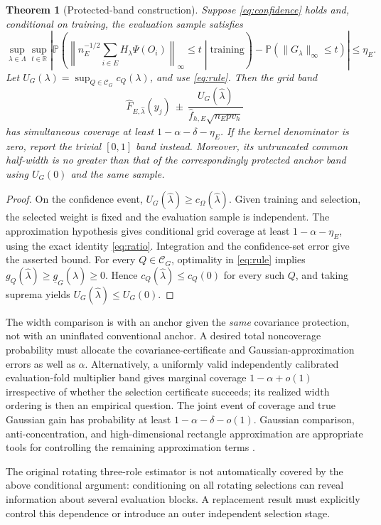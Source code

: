 \documentclass[11pt]{article}
\newtheorem{theorem}{Theorem}
\theoremstyle{remark}\newtheorem{remark}[theorem]{Remark}
\newcommand{\Pp}{\mathbb P}
\newcommand{\R}{\mathbb R}
\newcommand{\calC}{\mathcal C}
\begin{document}
\begin{theorem}[Protected-band construction]\label{thm:coverage}
Suppose \eqref{eq:confidence} holds and, conditional on training, the evaluation sample satisfies
\[
 \sup_{\lambda\in\Lambda}\sup_{t\in\R}
 \left|\Pp\left(\left\|n_E^{-1/2}\sum_{i\in E}H_\lambda\Psi(O_i)\right\|_\infty\leq t
 \middle|\text{training}\right)-\Pp(\|G_\lambda\|_\infty\leq t)\right|\leq\eta_E.
\]
Let $U_G(\lambda)=\sup_{Q\in\calC_G}c_Q(\lambda)$, and use \eqref{eq:rule}. Then the grid band
\[
 \widehat F_{E,\widehat\lambda}(y_j)\ \pm\
 \frac{U_G(\widehat\lambda)}{\widehat f_{h,E}\sqrt{n_Epv_h}}
\]
has simultaneous coverage at least $1-\alpha-\delta-\eta_E$. If the kernel denominator is zero, report the trivial $[0,1]$ band instead.
Moreover, its untruncated common half-width is no greater than that of the correspondingly protected anchor band using $U_G(0)$ and the same sample.
\end{theorem}
\begin{proof}
On the confidence event, $U_G(\widehat\lambda)\geq c_\Omega(\widehat\lambda)$.
Given training and selection, the selected weight is fixed and the evaluation sample is independent. The approximation hypothesis gives conditional grid coverage at least $1-\alpha-\eta_E$, using the exact identity \eqref{eq:ratio}. Integration and the confidence-set error give the asserted bound.
For every $Q\in\calC_G$, optimality in \eqref{eq:rule} implies
$g_Q(\widehat\lambda)\geq\underline g_G(\widehat\lambda)\geq0$.
Hence $c_Q(\widehat\lambda)\leq c_Q(0)$ for every such $Q$, and taking suprema yields $U_G(\widehat\lambda)\leq U_G(0)$.
\end{proof}

The width comparison is with an anchor given the \emph{same} covariance protection, not with an uninflated conventional anchor. A desired total noncoverage probability must allocate the covariance-certificate and Gaussian-approximation errors as well as $\alpha$.
Alternatively, a uniformly valid independently calibrated evaluation-fold multiplier band gives marginal coverage $1-\alpha+o(1)$ irrespective of whether the selection certificate succeeds; its realized width ordering is then an empirical question. The joint event of coverage and true Gaussian gain has probability at least $1-\alpha-\delta-o(1)$.
Gaussian comparison, anti-concentration, and high-dimensional rectangle approximation are appropriate tools for controlling the remaining approximation terms \citep{cckanti,cckclt}.

The original rotating three-role estimator is not automatically covered by the above conditional argument: conditioning on all rotating selections can reveal information about several evaluation blocks. A replacement result must explicitly control this dependence or introduce an outer independent selection stage.
\end{document}
